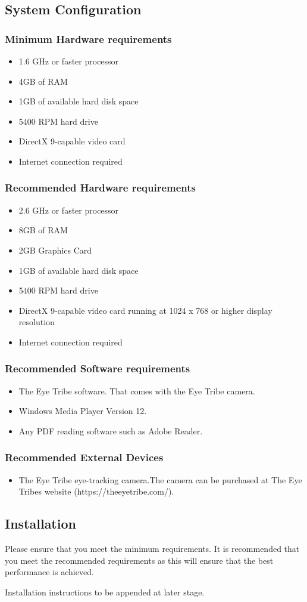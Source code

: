 \subsection{System Configuration}
\subsubsection{Minimum Hardware requirements}
\begin{itemize}
\item 1.6 GHz or faster processor
\item 4GB of RAM
\item 1GB of available hard disk space
\item 5400 RPM hard drive
\item DirectX 9-capable video card
\item Internet connection required
\end{itemize}

\subsubsection{Recommended Hardware requirements}
\begin{itemize}
\item 2.6 GHz or faster processor
\item 8GB of RAM
\item 2GB Graphics Card
\item 1GB of available hard disk space
\item 5400 RPM hard drive
\item DirectX 9-capable video card running at 1024 x 768 or higher display resolution
\item Internet connection required
\end{itemize}

\subsubsection{Recommended Software requirements}
\begin{itemize}
\item The Eye Tribe software. That comes with the Eye Tribe camera.
\item Windows Media Player Version 12.
\item Any PDF reading software such as Adobe Reader.
\end{itemize}

\subsubsection{Recommended External Devices}
\begin{itemize}
\item The Eye Tribe eye-tracking camera.The camera can be purchased at The Eye Tribes website (https://theeyetribe.com/).
\end{itemize}




\subsection{Installation}
Please ensure that you meet the minimum requirements. It is recommended that you meet the recommended requirements as this will ensure that the best performance is achieved.

Installation instructions to be appended at later stage.
